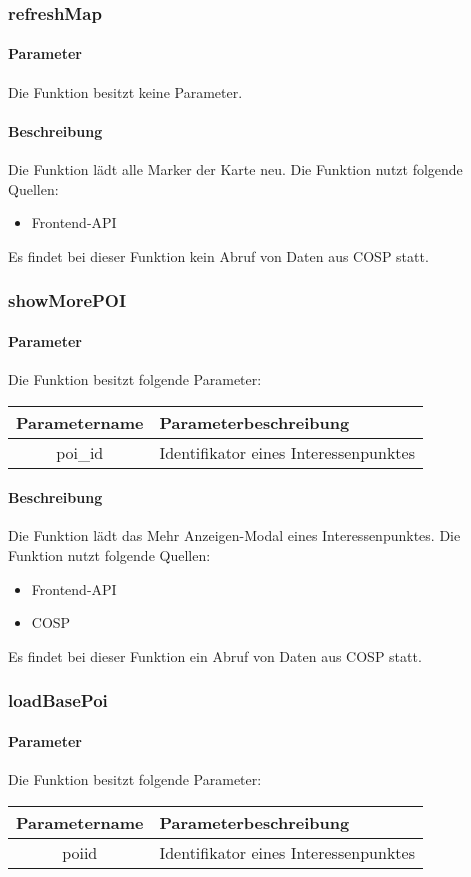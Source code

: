 \subsubsection{refreshMap}
\paragraph{Parameter} Die Funktion besitzt keine Parameter.
\paragraph{Beschreibung} Die Funktion lädt alle Marker der Karte neu. Die Funktion nutzt folgende Quellen:
\begin{itemize}
	\item Frontend-API
\end{itemize}
Es findet bei dieser Funktion kein Abruf von Daten aus {\glqq COSP\grqq} statt.
\subsubsection{showMorePOI}
\paragraph{Parameter} Die Funktion besitzt folgende Parameter:
\begin{table}[H]
	\begin{tabular}{|c|p{11cm}|}
		\hline
		\textbf{Parametername} & \textbf{Parameterbeschreibung} \\ \hline
		poi\_id & Identifikator eines Interessenpunktes \\ \hline
	\end{tabular}
\end{table}
\paragraph{Beschreibung} Die Funktion lädt das {\glqq Mehr Anzeigen\grqq}-Modal eines Interessenpunktes. Die Funktion nutzt folgende Quellen:
\begin{itemize}
	\item Frontend-API
	\item COSP
\end{itemize}
Es findet bei dieser Funktion ein Abruf von Daten aus {\glqq COSP\grqq} statt.
\subsubsection{loadBasePoi}
\paragraph{Parameter} Die Funktion besitzt folgende Parameter:
\begin{table}[H]
	\begin{tabular}{|c|p{11cm}|}
		\hline
		\textbf{Parametername} & \textbf{Parameterbeschreibung} \\ \hline
		poiid & Identifikator eines Interessenpunktes \\ \hline
	\end{tabular}
\end{table}
